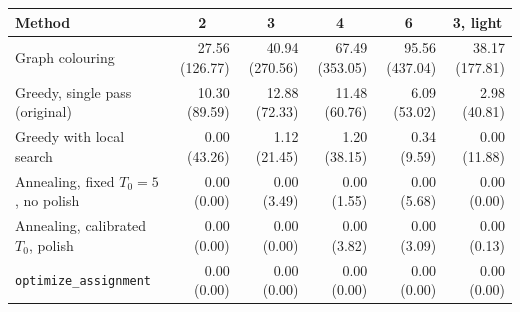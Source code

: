 \begin{tabular}{lrrrrr}
\toprule
Method & \multicolumn{1}{c}{2} & \multicolumn{1}{c}{3} & \multicolumn{1}{c}{4} & \multicolumn{1}{c}{6} & \multicolumn{1}{c}{3, light} \\
\midrule
Graph colouring & 27.56 (126.77) & 40.94 (270.56) & 67.49 (353.05) & 95.56 (437.04) & 38.17 (177.81) \\
Greedy, single pass (original) & 10.30 (89.59) & 12.88 (72.33) & 11.48 (60.76) & 6.09 (53.02) & 2.98 (40.81) \\
Greedy with local search & 0.00 (43.26) & 1.12 (21.45) & 1.20 (38.15) & 0.34 (9.59) & 0.00 (11.88) \\
Annealing, fixed $T_0 = 5$, no polish & 0.00 (0.00) & 0.00 (3.49) & 0.00 (1.55) & 0.00 (5.68) & 0.00 (0.00) \\
Annealing, calibrated $T_0$, polish & 0.00 (0.00) & 0.00 (0.00) & 0.00 (3.82) & 0.00 (3.09) & 0.00 (0.13) \\
\texttt{optimize\_assignment} & 0.00 (0.00) & 0.00 (0.00) & 0.00 (0.00) & 0.00 (0.00) & 0.00 (0.00) \\
\bottomrule
\end{tabular}
